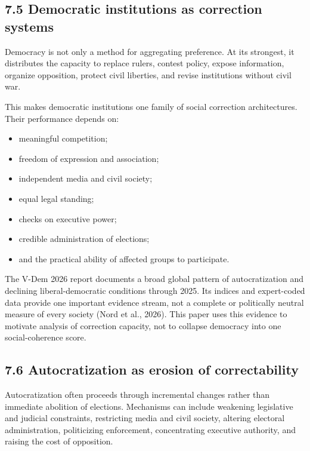 \documentclass[
  11pt,
]{article}
\providecommand{\tightlist}{%
  \setlength{\itemsep}{0pt}\setlength{\parskip}{0pt}}
\begin{document}
\subsection{7.5 Democratic institutions as correction
systems}\label{democratic-institutions-as-correction-systems}

Democracy is not only a method for aggregating preference. At its
strongest, it distributes the capacity to replace rulers, contest
policy, expose information, organize opposition, protect civil
liberties, and revise institutions without civil war.

This makes democratic institutions one family of social correction
architectures. Their performance depends on:

\begin{itemize}
\tightlist
\item
  meaningful competition;
\item
  freedom of expression and association;
\item
  independent media and civil society;
\item
  equal legal standing;
\item
  checks on executive power;
\item
  credible administration of elections;
\item
  and the practical ability of affected groups to participate.
\end{itemize}

The V-Dem 2026 report documents a broad global pattern of
autocratization and declining liberal-democratic conditions through
2025. Its indices and expert-coded data provide one important evidence
stream, not a complete or politically neutral measure of every society
(Nord et al., 2026). This paper uses this evidence to motivate analysis
of correction capacity, not to collapse democracy into one
social-coherence score.

\subsection{7.6 Autocratization as erosion of
correctability}\label{autocratization-as-erosion-of-correctability}

Autocratization often proceeds through incremental changes rather than
immediate abolition of elections. Mechanisms can include weakening
legislative and judicial constraints, restricting media and civil
society, altering electoral administration, politicizing enforcement,
concentrating executive authority, and raising the cost of opposition.
\end{document}
